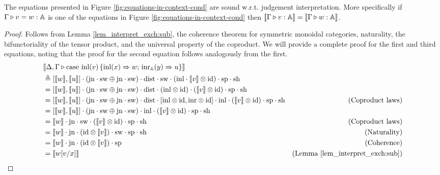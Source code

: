 \documentclass[a4paper,UKenglish,cleveref, autoref, thm-restate]{lipics-v2021}
\begin{document}
\begin{theorem} \label {theorem:eq_in_context}
  The equations presented in Figure \ref{fig:equations-in-context-cond} are sound w.r.t. judgement interpretation. More specifically if $ \Gamma \triangleright v = w: \mathbb{A}$ is one of the equations in Figure \ref{fig:equations-in-context-cond} then $[\![ \Gamma \triangleright v: \mathbb{A} ]\!] = [\![ \Gamma \triangleright w: \mathbb{A} ]\!]$.
\end{theorem}

\begin{proof}
  Follows from Lemma \autoref{lem_interpret_exch:sub}, the coherence theorem for symmetric monoidal categories, naturality,  the bifunctoriality of the tensor product, and the universal property of the coproduct.   
  We will provide a complete proof for the first and third equations, noting that the proof for the second equation follows analogously from the first.
  \begin{align*}
    &\llbracket \Delta,\Gamma \triangleright  \text{case }  \text{inl}(v)\, \{\text{inl} (x) \Rightarrow w ;\, \text{inr}_{\mathbb{A}} (y) \Rightarrow u\} \rrbracket \\
    & \triangleq  [\llbracket w\rrbracket,\llbracket u \rrbracket] \cdot (\text{jn} \cdot \mathrm{sw} \oplus \text{jn} \cdot \mathrm{sw}  ) \cdot \mathrm{dist} \cdot \mathrm{sw} \cdot (\mathrm{inl} \cdot \llbracket  v \rrbracket \otimes \text{id}) \cdot \text{sp} \cdot \text{sh} \\
    & =  [\llbracket w\rrbracket,\llbracket u \rrbracket] \cdot (\text{jn} \cdot \mathrm{sw} \oplus \text{jn} \cdot \mathrm{sw} ) \cdot \mathrm{dist} \cdot (\mathrm{inl} \otimes \text{id}  ) \cdot ( \llbracket  v \rrbracket \otimes \text{id}) \cdot \text{sp} \cdot \text{sh}  \\
    & =  [\llbracket w\rrbracket,\llbracket u \rrbracket] \cdot (\text{jn} \cdot \mathrm{sw} \oplus \text{jn} \cdot \mathrm{sw} ) \cdot \mathrm{dist} \cdot [\mathrm{inl} \otimes \mathrm{id}, \mathrm{inr} \otimes \mathrm{id}] \cdot \mathrm{inl}  \cdot ( \llbracket  v \rrbracket \otimes \text{id}) \cdot \text{sp} \cdot \text{sh}  &(\text{Coproduct laws})\\
    & =  [\llbracket w\rrbracket,\llbracket u \rrbracket] \cdot (\text{jn} \cdot \mathrm{sw} \oplus \text{jn} \cdot \mathrm{sw} )  \cdot \mathrm{inl}  \cdot ( \llbracket  v \rrbracket \otimes \text{id}) \cdot \text{sp} \cdot \text{sh} \\
    & = \llbracket  w \rrbracket\cdot \text{jn} \cdot   \mathrm{sw} \cdot(\llbracket v \rrbracket \otimes  \text{id}) \cdot \text{sp} \cdot \text{sh} & {\text{(Coproduct laws)}} \\
    &=  \llbracket  w \rrbracket\cdot \text{jn} \cdot(  \text{id}\otimes \llbracket v \rrbracket ) \cdot   \mathrm{sw} \cdot \text{sp} \cdot \text{sh} & {\text{(Naturality)}} \\
    &= \llbracket w \rrbracket \cdot \text{jn} \cdot( \text{id} \otimes \llbracket v \rrbracket) \cdot \text{sp} & {\text{(Coherence)}}\\
    & = \llbracket w[v/x]  \rrbracket  & {\text{(Lemma \ref{lem_interpret_exch:sub})}}
\end{align*}


\end{proof}
\end{document}
